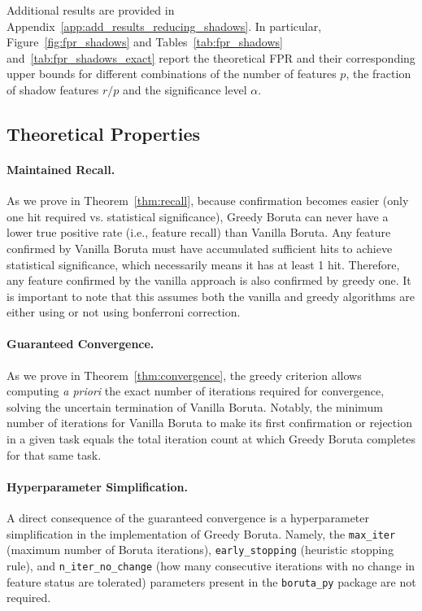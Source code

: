 \documentclass[runningheads]{llncs}
\begin{document}
Additional results are provided in Appendix~\ref{app:add_results_reducing_shadows}. In particular, Figure~\ref{fig:fpr_shadows} and Tables~\ref{tab:fpr_shadows} and~\ref{tab:fpr_shadows_exact} report the theoretical FPR and their corresponding upper bounds for different combinations of the number of features \(p\), the fraction of shadow features \(r/p\) and the significance level \(\alpha\).

\subsection{Theoretical Properties}
\label{sec:method:theory}

\paragraph{Maintained Recall.}
As we prove in Theorem~\ref{thm:recall}, because confirmation becomes easier (only one hit required vs. statistical significance), Greedy Boruta can never have a lower true positive rate (i.e., feature recall) than Vanilla Boruta. Any feature confirmed by Vanilla Boruta must have accumulated sufficient hits to achieve statistical significance, which necessarily means it has at least 1 hit. Therefore, any feature confirmed by the vanilla approach is also confirmed by greedy one. It is important to note that this assumes both the vanilla and greedy algorithms are either using or not using bonferroni correction.

\paragraph{Guaranteed Convergence.}
As we prove in Theorem~\ref{thm:convergence}, the greedy criterion allows computing \emph{a priori} the exact number of iterations required for convergence, solving the uncertain termination of Vanilla Boruta. Notably, the minimum number of iterations for Vanilla Boruta to make its first confirmation or rejection in a given task equals the total iteration count at which Greedy Boruta completes for that same task.

\paragraph{Hyperparameter Simplification.}
A direct consequence of the guaranteed convergence is a hyperparameter simplification in the implementation of Greedy Boruta. Namely, the \texttt{max\_iter} (maximum number of Boruta iterations), \texttt{early\_stopping} (heuristic stopping rule), and \texttt{n\_iter\_no\_change} (how many consecutive iterations with no change in feature status are tolerated) parameters present in the \texttt{boruta\_py} package are not required.
\end{document}
